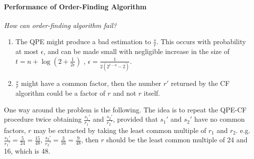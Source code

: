 \documentclass[]{book}
\theoremstyle{nonumberplain}
\begin{document}
\paragraph{Performance of Order-Finding Algorithm}

\textit{How can order-finding algorithm fail?}
\begin{enumerate}
	\item The QPE might produce a bad estimation to $\frac{s}{r}$. This occurs with probability at most $\epsilon$, and can be made small with negligible increase in the size of $t=n+\log(2+\frac{1}{2\epsilon})$ , $\epsilon = \frac{1}{2(2^{t-n}-2)}$.
	\item $\frac{s}{r}$ might have a common factor, then the number $r'$ returned by the CF algorithm could be a factor of $r$ and not $r$ itself.
\end{enumerate}
One way around the problem is the following. The idea is to repeat the QPE-CF procedure twice obtaining $\frac{s_{1}'}{r_{1}'}$ and $\frac{s_{2}'}{r_{2}'}$, provided that $s_{1}'$ and $s_{2}'$ have no common factors, $r$ may be extracted by taking the least common multiple of $r_{1}$ and $r_{2}$. e.g. $\frac{s_1'}{r_1'}=\frac{5}{24}=\frac{15}{48}$, $\frac{s_2'}{r_2'}=\frac{3}{16}=\frac{9}{48}$, then $r$ should be the least common multiple of 24 and 16, which is 48.
\end{document}
